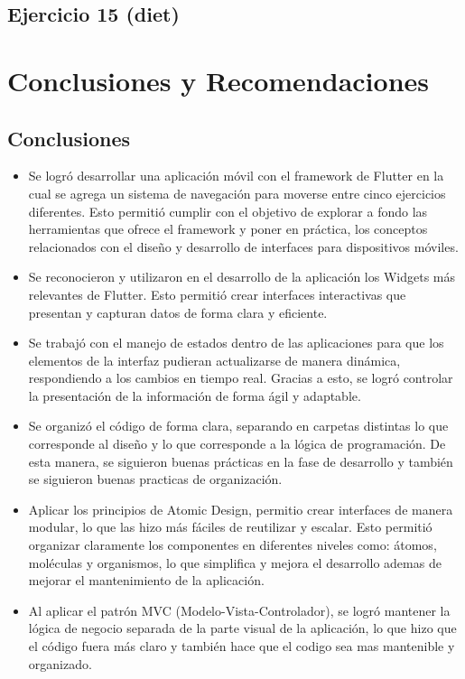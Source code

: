 \documentclass[12pt,letterpaper]{article}
\begin{document}
\subsection{Ejercicio 15 (diet)}



\section{Conclusiones y Recomendaciones}
\subsection{Conclusiones}

\begin{itemize}
    \item Se logró desarrollar una aplicación móvil con el framework de Flutter en la cual se agrega un sistema de navegación para moverse entre cinco ejercicios diferentes. Esto permitió cumplir con el objetivo de explorar a fondo las herramientas que ofrece el framework y poner en práctica, los conceptos relacionados con el diseño y desarrollo de interfaces para dispositivos móviles.
    \item Se reconocieron y utilizaron en el desarrollo de la aplicación los Widgets más relevantes de Flutter. Esto permitió crear interfaces interactivas que presentan y capturan datos de forma clara y eficiente.
    \item Se trabajó con el manejo de estados dentro de las aplicaciones para que los elementos de la interfaz pudieran actualizarse de manera dinámica, respondiendo a los cambios en tiempo real. Gracias a esto, se logró controlar la presentación de la información de forma ágil y adaptable.
    \item Se organizó el código de forma clara, separando en carpetas distintas lo que corresponde al diseño y lo que corresponde a la lógica de programación. De esta manera, se siguieron buenas prácticas en la fase de desarrollo y también se siguieron buenas practicas de organización.
    \item Aplicar los principios de Atomic Design, permitio crear interfaces de manera modular, lo que las hizo más fáciles de reutilizar y escalar. Esto permitió organizar claramente los componentes en diferentes niveles como: átomos, moléculas y organismos, lo que simplifica y mejora el desarrollo ademas de mejorar el mantenimiento de la aplicación.
    \item Al aplicar el patrón MVC (Modelo-Vista-Controlador), se logró mantener la lógica de negocio separada de la parte visual de la aplicación, lo que hizo que el código fuera más claro y también hace que el codigo sea mas mantenible y organizado.
\end{itemize}
\end{document}
